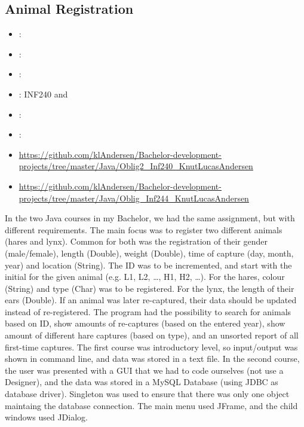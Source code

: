 \label{sec:section4}

\subsection{Animal Registration}
\label{sec:animal_registration}
\begin{itemize} 
	\item {}: 
	\item {}: 
	\item {}: 
	\item {}: INF240 and  
	\item {}: 
	\item {}: 
	\item {} \url{https://github.com/klAndersen/Bachelor-development-projects/tree/master/Java/Oblig2_Inf240_KnutLucasAndersen}
	\item {} \url{https://github.com/klAndersen/Bachelor-development-projects/tree/master/Java/Oblig_Inf244_KnutLucasAndersen}
\end{itemize} 
In the two Java courses in my Bachelor, we had the same assignment, but with different requirements. 
The main focus was to register two different animals (hares and lynx). 
Common for both was the registration of their gender (male/female), length (Double), weight (Double), time of capture (day, month, year) and location (String). 
The ID was to be incremented, and start with the initial for the given animal (e.g. L1, L2, \ldots, H1, H2, \ldots). 
For the hares, colour (String) and type (Char) was to be registered. 
For the lynx, the length of their ears (Double).
\vspace{0.5em}\newline
If an animal was later re-captured, their data should be updated instead of re-registered. 
The program had the possibility to search for animals based on ID, show amounts of re-captures (based on the entered year), 
show amount of different hare captures (based on type), and an unsorted report of all first-time captures.
\vspace{0.5em}\newline
The first course was introductory level, so input/output was shown in command line, and data was stored in a text file. 
In the second course, the user was presented with a GUI that we had to code ourselves (not use a Designer), and the data was stored in a MySQL Database 
(using JDBC as database driver). 
Singleton was used to ensure that there was only one object maintaing the database connection. 
The main menu used JFrame, and the child windows used JDialog.

